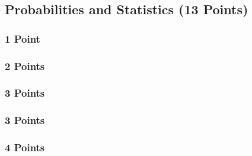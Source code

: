 \newif\ifvimbug
\vimbugfalse

\ifvimbug

\fi


\subsection{Probabilities and Statistics (13 Points)}
\subsubsection{1 Point}

\subsubsection{2 Points}

\subsubsection{3 Points}

\subsubsection{3 Points}

\subsubsection{4 Points}
